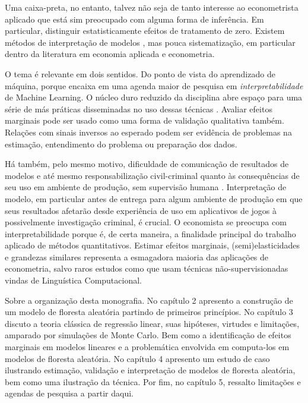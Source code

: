 Uma caixa-preta, no entanto, talvez não seja de tanto interesse ao econometrista aplicado que está sim preocupado com alguma forma de inferência. Em particular, distinguir estatisticamente efeitos de tratamento de zero. Existem métodos de interpretação de modelos \cite{ribeiro2016model}, mas pouca sistematização, em particular dentro da literatura em economia aplicada e econometria. 

O tema é relevante em dois sentidos. Do ponto de vista do aprendizado de máquina, porque encaixa em uma agenda maior de pesquisa em \textit{interpretabilidade} de Machine Learning. O núcleo duro reduzido da disciplina abre espaço para uma série de más práticas disseminadas no uso dessas técnicas \cite{flach2019performance}. Avaliar efeitos marginais pode ser usado como uma forma de validação qualitativa também. Relações com sinais inversos ao esperado podem ser evidência de problemas na estimação, entendimento do problema ou preparação dos dados.

Há também, pelo mesmo motivo, dificuldade de comunicação de resultados de modelos e até mesmo responsabilização civil-criminal quanto às consequências de seu uso em ambiente de produção, sem supervisão humana \cite{lepri2018fair}. Interpretação de modelo, em particular antes de entrega para algum ambiente de produção em que seus resultados afetarão desde experiência de uso em aplicativos de jogos à possivelmente investigação criminal, é crucial. O economista se preocupa com interpretabilidade porque é, de certa maneira, a finalidade principal do trabalho aplicado de métodos quantitativos. Estimar efeitos marginais, (semi)elasticidades e grandezas similares representa a esmagadora maioria das aplicações de econometria, salvo raros estudos como  que usam técnicas não-supervisionadas vindas de Linguística Computacional.

Sobre a organização desta monografia. No capítulo 2 apresento a construção de um modelo de floresta aleatória partindo de primeiros princípios. No capítulo 3 discuto a teoria clássica de regressão linear, suas hipóteses, virtudes e limitações, amparado por simulações de Monte Carlo. Bem como a identificação de efeitos marginais em modelos lineares e a problemática envolvida em computa-los em modelos de floresta aleatória. No capítulo 4 apresento um estudo de caso ilustrando estimação, validação e interpretação de modelos de floresta aleatória, bem como uma ilustração da técnica. Por fim, no capítulo 5, ressalto limitações e agendas de pesquisa a partir daqui.


